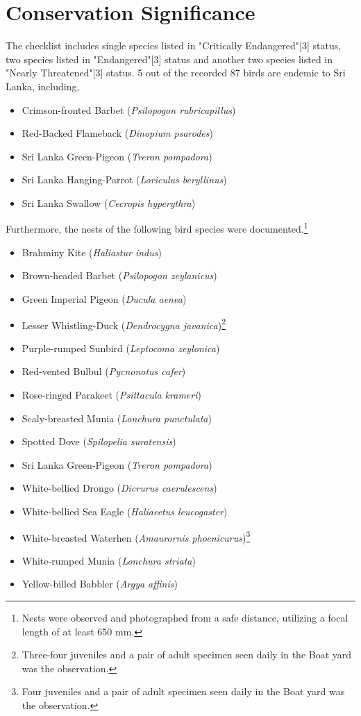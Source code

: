\section{Conservation Significance}
The checklist includes single species listed in "Critically Endangered"[3] status, two species listed in "Endangered"[3] status  and another two species listed in "Nearly Threatened"[3] status. 5 out of the recorded 87 birds are endemic to Sri Lanka, including,
\begin{itemize}
\item Crimson-fronted Barbet (\textit{Psilopogon rubricapillus})
\item Red{-}Backed Flameback (\textit{Dinopium psarodes})
\item Sri Lanka Green-Pigeon (\textit{Treron pompadora})
 \item Sri Lanka Hanging-Parrot (\textit{Loriculus beryllinus})
   \item Sri Lanka Swallow (\textit{Cecropis hyperythra})
\end{itemize}
Furthermore, the nests of the following bird species were documented.\footnote{Nests were observed and photographed from a safe distance, utilizing a focal length of at least 650 mm.}
\begin{itemize}
\item Brahminy Kite (\textit{Haliastur indus})
\item Brown-headed Barbet (\textit{Psilopogon zeylanicus})
\item Green Imperial Pigeon (\textit{Ducula aenea})
\item Lesser Whistling{-}Duck (\textit{Dendrocygna javanica})\footnote{Three-four juveniles and a pair of adult specimen seen daily in the Boat yard was the observation.}
\item Purple-rumped Sunbird (\textit{Leptocoma zeylonica})
\item Red-vented Bulbul (\textit{Pycnonotus cafer})
\item Rose-ringed Parakeet (\textit{Psittacula krameri})
\item Scaly-breasted Munia (\textit{Lonchura punctulata})
\item Spotted Dove (\textit{Spilopelia suratensis})
\item Sri Lanka Green-Pigeon (\textit{Treron pompadora})
\item White-bellied Drongo (\textit{Dicrurus caerulescens})
\item White-bellied Sea Eagle (\textit{Haliaeetus leucogaster})
\item White-breasted Waterhen (\textit{Amaurornis phoenicurus})\footnote{Four juveniles and a pair of adult specimen seen daily in the Boat yard was the observation.}
\item White-rumped Munia (\textit{Lonchura striata})
\item Yellow-billed Babbler (\textit{Argya affinis})
\end{itemize}
